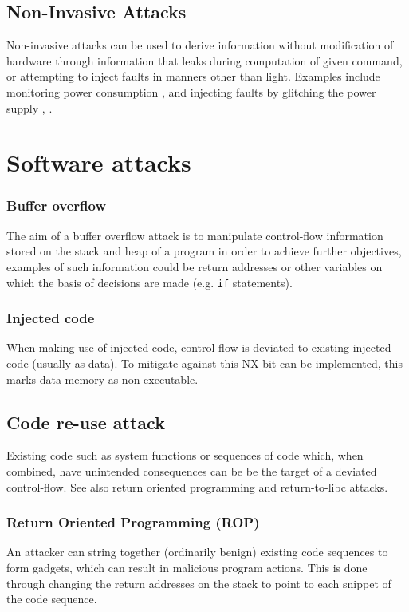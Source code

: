 \subsection{Non-Invasive Attacks}
Non-invasive attacks can be used to derive information without modification of hardware through information that leaks during computation of given command, or attempting to inject faults in manners other than light. Examples include monitoring power consumption \cite{Maurer1999}, \cite{MangardStefan2007Paa:} and injecting faults by glitching the power supply \cite{Anderson1996}, \cite{Bar-el2006}.

\section{Software attacks}
\subsubsection{Buffer overflow}

The aim of a buffer overflow attack is to manipulate control-flow information stored on the stack and heap of a program in order to achieve further objectives, examples of such information could be return addresses or other variables on which the basis of decisions are made (e.g. \verb|if| statements).

\subsubsection{Injected code}

When making use of injected code, control flow is deviated to existing injected code (usually as data). To mitigate against this NX bit can be implemented, this marks data memory as non-executable.

\subsection{Code re-use attack}
Existing code such as system functions or sequences of code which, when combined, have unintended consequences can be be the target of a deviated control-flow. See also return oriented programming and return-to-libc attacks.

\subsubsection{Return Oriented Programming (ROP)}
An attacker can string together (ordinarily benign) existing code sequences to form gadgets, which can result in malicious program actions. This is done through changing the return addresses on the stack to point to each snippet of the code sequence.

